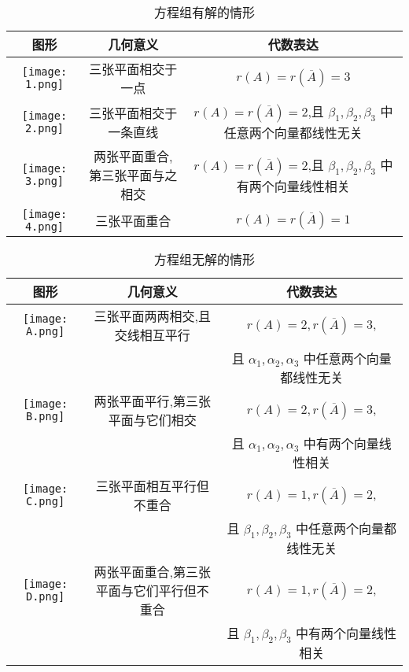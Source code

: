 \documentclass[UTF8]{ctexart}
\theoremstyle{remark}
\begin{document}
	\begin{table}[h]
		\centering
		\caption{方程组有解的情形}
		\begin{tabular}{ccc}
			\toprule
			图形 & 几何意义 & 代数表达 \\
			\midrule
			\texttt{[image: 1.png]} & 三张平面相交于一点 & \(r(A) = r(\overline{A}) = 3\) \\
			\texttt{[image: 2.png]} & 三张平面相交于一条直线 & \(r(A) = r(\overline{A}) = 2\),且 \(\beta_1, \beta_2, \beta_3\) 中任意两个向量都线性无关 \\
			\texttt{[image: 3.png]} & 两张平面重合,第三张平面与之相交 & \(r(A) = r(\overline{A}) = 2\),且 \(\beta_1, \beta_2, \beta_3\) 中有两个向量线性相关 \\
			\texttt{[image: 4.png]} & 三张平面重合 & \(r(A) = r(\overline{A}) = 1\) \\
			\bottomrule
		\end{tabular}
	\end{table}
	
	\begin{table}[h]
		\centering
		\caption{方程组无解的情形}
		\begin{tabular}{ccc}
			\toprule
			图形 & 几何意义 & 代数表达 \\
			\midrule
			\texttt{[image: A.png]} & 三张平面两两相交,且交线相互平行 & \(r(A) = 2, r(\overline{A}) = 3\), \\
			&&且 \(\alpha_1, \alpha_2, \alpha_3\) 中任意两个向量都线性无关\\
			\texttt{[image: B.png]} & 两张平面平行,第三张平面与它们相交 & \(r(A) = 2, r(\overline{A}) = 3\),\\
			&&且 \(\alpha_1, \alpha_2, \alpha_3\) 中有两个向量线性相关 \\
			\texttt{[image: C.png]} & 三张平面相互平行但不重合 & \(r(A) = 1, r(\overline{A}) = 2\), \\
			&&且 \(\beta_1, \beta_2, \beta_3\) 中任意两个向量都线性无关\\
			\texttt{[image: D.png]} & 两张平面重合,第三张平面与它们平行但不重合 & \(r(A) = 1, r(\overline{A}) = 2\), \\
			&&且 \(\beta_1, \beta_2, \beta_3\) 中有两个向量线性相关\\
			\bottomrule
		\end{tabular}
	\end{table}
	
\end{document}
